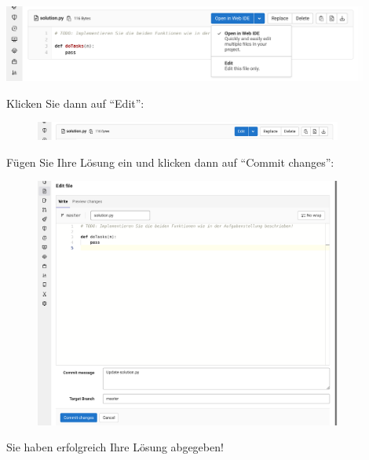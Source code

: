 \documentclass{scrartcl}
\begin{document}
\begin{enumerate}
		\includegraphics[width=0.9\textwidth]{img/screenshot-edit-dropdown.png}
		
		\vfill
		
		Klicken Sie dann auf \enquote{Edit}:
		
		\vfill
		
		\begin{figure}[h!]
			\centering
			\includegraphics[width=0.9\textwidth]{img/screenshot-edit-button.png}
		\end{figure}
		
		\vfill
		
		\pagebreak
		
		Fügen Sie Ihre Lösung ein und klicken dann auf \enquote{Commit changes}:
		
		\vfill
		
		\begin{figure}[h!]
			\centering
			\includegraphics[width=0.9\textwidth]{img/screenshot-editor.png}
		\end{figure}
		
		\vfill
		
		Sie haben erfolgreich Ihre Lösung abgegeben!
		
		\vfill
		

\end{enumerate}
\end{document}
